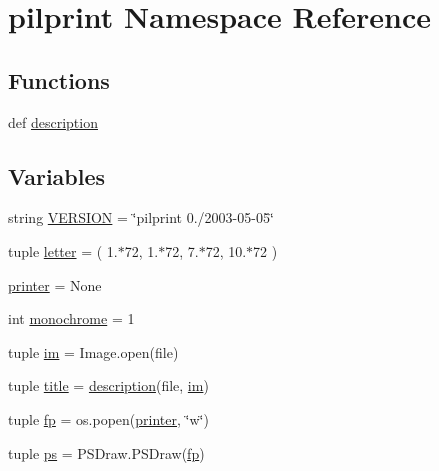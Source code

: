 \hypertarget{namespacepilprint}{\section{pilprint Namespace Reference}
\label{namespacepilprint}
}
\subsection*{Functions}
\begin{DoxyCompactItemize}
\item 
def \hyperlink{namespacepilprint_a23219bc2de0d7f218c51c8a75a13490b}{description}
\end{DoxyCompactItemize}
\subsection*{Variables}
\begin{DoxyCompactItemize}
\item 
string \hyperlink{namespacepilprint_abc1204fef3f00504f698236ea8c8ffa3}{V\-E\-R\-S\-I\-O\-N} = \char`\"{}pilprint 0./2003-\/05-\/05\char`\"{}
\item 
tuple \hyperlink{namespacepilprint_a42e4b8ea209495409b00019c4d19d3d9}{letter} = ( 1.$\ast$72, 1.$\ast$72, 7.$\ast$72, 10.$\ast$72 )
\item 
\hyperlink{namespacepilprint_ad0e8dd369968728638f4d68845c1eb6a}{printer} = None
\item 
int \hyperlink{namespacepilprint_a78ede567a10b403468d3cdce91bed497}{monochrome} = 1
\item 
tuple \hyperlink{namespacepilprint_a7f71d6dcbf47eabffad2673feca0d8e1}{im} = Image.\-open(file)
\item 
tuple \hyperlink{namespacepilprint_a0444e219e533104638749b8c91f07160}{title} = \hyperlink{namespacepilprint_a23219bc2de0d7f218c51c8a75a13490b}{description}(file, \hyperlink{namespacepilprint_a7f71d6dcbf47eabffad2673feca0d8e1}{im})
\item 
tuple \hyperlink{namespacepilprint_ab34f4c4236680d821cd33cc4f642f8d8}{fp} = os.\-popen(\hyperlink{namespacepilprint_ad0e8dd369968728638f4d68845c1eb6a}{printer}, \char`\"{}w\char`\"{})
\item 
tuple \hyperlink{namespacepilprint_aba88a64e0d2143af5a1255b3bc8dfb15}{ps} = P\-S\-Draw.\-P\-S\-Draw(\hyperlink{namespacepilprint_ab34f4c4236680d821cd33cc4f642f8d8}{fp})
\end{DoxyCompactItemize}


